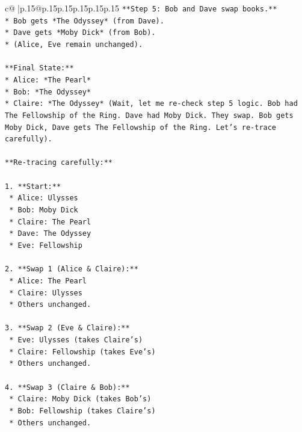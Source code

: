 \documentclass{article}
\begin{document}
{\begin{supertabular}{c@{$\;$}|p{.15\linewidth}@{}p{.15\linewidth}p{.15\linewidth}p{.15\linewidth}p{.15\linewidth}p{.15\linewidth}}
{{{\texttt{**Step 5: Bob and Dave swap books.**} \\
\texttt{*   Bob gets *The Odyssey* (from Dave).} \\
\texttt{*   Dave gets *Moby Dick* (from Bob).} \\
\texttt{*   (Alice, Eve remain unchanged).} \\
\\ 
\texttt{**Final State:**} \\
\texttt{*   Alice: *The Pearl*} \\
\texttt{*   Bob: *The Odyssey*} \\
\texttt{*   Claire: *The Odyssey* (Wait, let me re{-}check step 5 logic. Bob had The Fellowship of the Ring. Dave had Moby Dick. They swap. Bob gets Moby Dick, Dave gets The Fellowship of the Ring. Let's re{-}trace carefully).} \\
\\ 
\texttt{**Re{-}tracing carefully:**} \\
\\ 
\texttt{1.  **Start:**} \\
\texttt{    *   Alice: Ulysses} \\
\texttt{    *   Bob: Moby Dick} \\
\texttt{    *   Claire: The Pearl} \\
\texttt{    *   Dave: The Odyssey} \\
\texttt{    *   Eve: Fellowship} \\
\\ 
\texttt{2.  **Swap 1 (Alice \& Claire):**} \\
\texttt{    *   Alice: The Pearl} \\
\texttt{    *   Claire: Ulysses} \\
\texttt{    *   Others unchanged.} \\
\\ 
\texttt{3.  **Swap 2 (Eve \& Claire):**} \\
\texttt{    *   Eve: Ulysses (takes Claire's)} \\
\texttt{    *   Claire: Fellowship (takes Eve's)} \\
\texttt{    *   Others unchanged.} \\
\\ 
\texttt{4.  **Swap 3 (Claire \& Bob):**} \\
\texttt{    *   Claire: Moby Dick (takes Bob's)} \\
\texttt{    *   Bob: Fellowship (takes Claire's)} \\
\texttt{    *   Others unchanged.} \\
}}}
\end{supertabular}}
\end{document}
